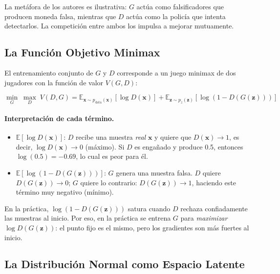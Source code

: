 \documentclass[a4paper,11pt]{article}
\begin{document}
La metáfora de los autores es ilustrativa: $G$ actúa como falsificadores
que producen moneda falsa, mientras que $D$ actúa como la policía que intenta
detectarlos. La competición entre ambos los impulsa a mejorar mutuamente.

\subsection{La Función Objetivo Minimax}

El entrenamiento conjunto de $G$ y $D$ corresponde a un juego minimax de dos
jugadores con la función de valor $V(G,D)$:

\begin{equation}
    \label{eq:minimax}
    \min_{G}\;\max_{D}\;V(D,G)
    = \mathbb{E}_{\bm{x}\sim p_{\text{data}}(\bm{x})}\!\left[\log D(\bm{x})\right]
    + \mathbb{E}_{\bm{z}\sim p_z(\bm{z})}\!\left[\log\!\left(1-D(G(\bm{z}))\right)\right]
\end{equation}

\paragraph{Interpretación de cada término.}

\begin{itemize}
    \item $\mathbb{E}\!\left[\log D(\bm{x})\right]$: $D$ recibe una muestra
          \emph{real} $\bm{x}$ y quiere que $D(\bm{x})\to 1$, es decir,
          $\log D(\bm{x})\to 0$ (máximo). Si $D$ es engañado y produce 0.5,
          entonces $\log(0.5)=-0.69$, lo cual es peor para él.
    \item $\mathbb{E}\!\left[\log(1-D(G(\bm{z})))\right]$: $G$ genera una muestra
          falsa. $D$ quiere $D(G(\bm{z}))\to 0$; $G$ quiere lo contrario:
          $D(G(\bm{z}))\to 1$, haciendo este término muy negativo (mínimo).
\end{itemize}

En la práctica, $\log(1-D(G(\bm{z})))$ satura cuando $D$ rechaza
confiadamente las muestras al inicio. Por eso, en la práctica se entrena $G$
para \emph{maximizar} $\log D(G(\bm{z}))$: el punto fijo es el mismo,
pero los gradientes son más fuertes al inicio.

\subsection{La Distribución Normal como Espacio Latente}
\end{document}
